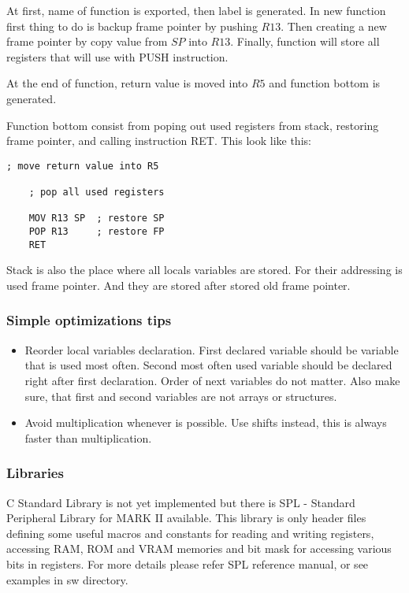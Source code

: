 At first, name of function is exported, then label is generated. In new function
first thing to do is backup frame pointer by pushing $R13$. Then creating a new
frame pointer by copy value from $SP$ into $R13$. Finally, function will store all
registers that will use with PUSH instruction.

At the end of function, return value is moved into $R5$ and function bottom is
generated.

Function bottom consist from poping out used registers from stack, restoring frame pointer,
and calling instruction RET. This look like this:

\begin{lstlisting}[language={[markII]Assembler}, frame=single]
    ; move return value into R5

    ; pop all used registers

    MOV R13 SP  ; restore SP
    POP R13     ; restore FP
    RET
\end{lstlisting}

Stack is also the place where all locals variables are stored. For their addressing
is used frame pointer. And they are stored after stored old frame pointer.

\subsubsection{Simple optimizations tips}

\begin{itemize}

    \item
    Reorder local variables declaration. First declared variable should be
    variable that is used most often. Second most often used variable should be
    declared right after first declaration. Order of next variables do not
    matter. Also make sure, that first and second variables are not arrays or
    structures.

    \item
    Avoid multiplication whenever is possible. Use shifts instead, this is
    always faster than multiplication.

\end{itemize}

\subsubsection{Libraries}

C Standard Library is not yet implemented but there is SPL - Standard
Peripheral Library for MARK II available. This library is only header files
defining some useful macros and constants for reading and writing registers,
accessing RAM, ROM and VRAM memories and bit mask for accessing various bits in
registers. For more details please refer SPL reference manual, or see examples
in sw directory.

